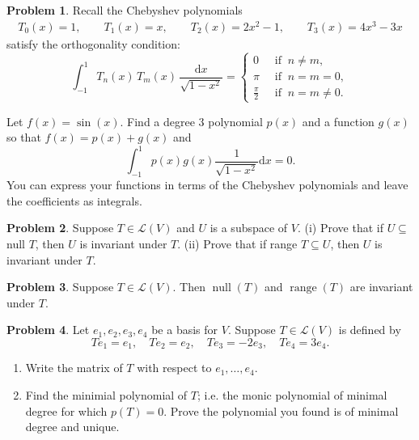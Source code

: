 \documentclass[12pt]{article}
\theoremstyle{definition}
\newtheorem{problem}{Problem}
\begin{document}
\begin{problem}
    Recall the Chebyshev polynomials
    \begin{align*}
        T_0(x) = 1
        ,\qquad T_1(x) = x
        ,\qquad T_2(x) = 2x^2 - 1
        ,\qquad T_3(x) = 4x^3 - 3x 
    \end{align*}
    satisfy the orthogonality condition:
    \begin{equation*}
        \int_{-1}^1 T_n(x)\,T_m(x)\,\frac{\mathrm{d}x}{\sqrt{1-x^2}} = 
        \begin{cases}
        0             & ~\text{ if }~ n \ne m, \\
        \pi           & ~\text{ if }~ n=m=0, \\
        \frac{\pi}{2} & ~\text{ if }~ n=m \ne 0.
        \end{cases}
    \end{equation*}

    Let $f(x) = \sin(x)$. Find a degree $3$ polynomial $p(x)$ and a function $g(x)$ so that $f(x) = p(x) + g(x)$ and 
    \[
        \int_{-1}^1 p(x) g(x) \frac{1}{\sqrt{1-x^2}}\mathrm{d}{x} = 0.
    \]
    You can express your functions in terms of the Chebyshev polynomials and leave the coefficients as integrals.
\end{problem}

\begin{problem}
    Suppose $T \in \mathcal{L}(V)$ and $U$ is a subspace of $V$.
        (i) Prove that if $U \subseteq$ null $T$, then $U$ is invariant under $T$.
        (ii) Prove that if range $T \subseteq U$, then $U$ is invariant under $T$.
\end{problem}

\begin{problem}
    Suppose $T\in\mathcal{L}(V)$. Then $\operatorname{null}(T)$ and $\operatorname{range}(T)$ are invariant under $T$.
\end{problem}

\begin{problem}
    Let $e_1, e_2, e_3, e_4$ be a basis for $V$.
    Suppose $T\in\mathcal{L}(V)$ is defined by
    \[
        Te_1 = e_1,\quad
        Te_2 = e_2,\quad
        Te_3= -2e_3,\quad
        Te_4 = 3e_4.
        \]

    \begin{enumerate}[label=(\alph*)]
        \item Write the matrix of $T$ with respect to $e_1, \ldots, e_4$.
        \item Find the minimial polynomial of $T$; i.e. the monic polynomial of minimal degree for which $p(T) = 0$. 
        Prove the polynomial you found is of minimal degree and unique.
    \end{enumerate}
\end{problem}
\end{document}
